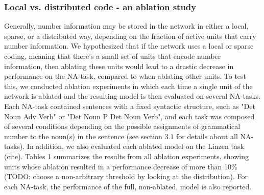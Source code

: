 \subsubsection{Local vs. distributed code - an ablation study}
Generally, number information may be stored in the network in either a local, sparse, or a distributed way, depending on the fraction of active units that carry number information. 
We hypothesized that if the network uses a local or sparse coding, meaning that there's a small set of units that encode number information, then ablating these units would lead to a drastic decrease in performance on the NA-task, compared to when ablating other units. 
To test this, we conducted ablation experiments in which each time a single unit of the network is ablated and the resulting model is then evaluated on several NA-tasks. 
Each NA-task contained sentences with a fixed syntactic structure, such as "Det Noun Adv Verb" or "Det Noun P Det Noun Verb", and each task was composed of several conditions depending on the possible assignments of grammatical number to the noun(s) in the sentence (see section 3.1 for details about all NA-tasks). 
In addition, we also evaluated each ablated model on the Linzen task (cite). 
Tables 1 summarizes the results from all ablation experiments, showing units whose ablation resulted in a performance decrease of more than 10\% (TODO: choose a non-arbitrary threshold by looking at the distribution). 
For each NA-task, the performance of the full, non-ablated, model is also reported.

